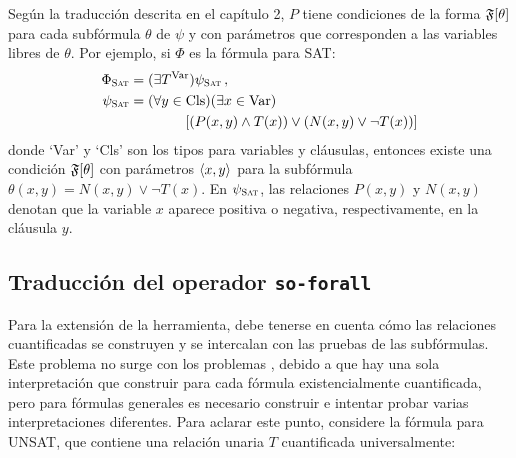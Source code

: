 Según la traducción descrita en el capítulo 2, 
$P$ tiene condiciones de la forma $\mathfrak{F}[\theta]$
para cada subfórmula $\theta$ de $\psi$ y con parámetros que corresponden a las
variables libres de $\theta$. Por ejemplo, si $\Phi$ es la fórmula para SAT:
\begin{alignat*}{1}
\Phi_{\textsc{Sat}} &= (\exists T^\text{Var})\psi_{\textsc{Sat}} \,, \\
\psi_{\textsc{Sat}} &= (\forall y\in \text{Cls})(\exists x\in\text{Var}) \notag \\
          &\quad\quad\quad\quad
               [(P(x,y) \land T(x)) \lor (N(x,y) \lor \neg T(x))]
\end{alignat*}
donde `Var' y `Cls' son los tipos para variables y cláusulas,
entonces existe una condición $\mathfrak{F}[\theta]$ con parámetros
$\langle x,y \rangle$ para la subfórmula $\theta(x,y)=N(x,y)\lor\neg T(x)$.
En $\psi_{\textsc{Sat}}$, las relaciones $P(x,y)$ y $N(x,y)$ denotan
que la variable $x$ aparece positiva o negativa, respectivamente, en la
cláusula $y$.



\subsection{Traducción del operador \texttt{so-forall}}
Para la extensión de la herramienta, debe tenerse en cuenta cómo las relaciones
cuantificadas se construyen y se intercalan con las pruebas de las subfórmulas.
Este problema no surge con los problemas \SOE, debido a que hay una sola
interpretación que construir para cada fórmula existencialmente cuantificada,
pero para fórmulas generales es necesario construir e intentar probar varias
interpretaciones diferentes.
Para aclarar este punto, considere la fórmula para UNSAT, que contiene una
relación unaria $T$ cuantificada universalmente:

